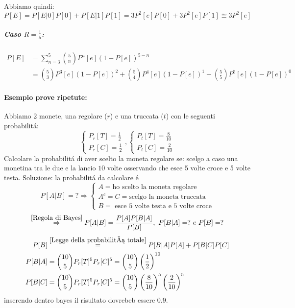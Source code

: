                 Abbiamo quindi:
                \[
                    P[E] =P[E|0]P[0] + P[E|1]P[1] = 3 P^2[e] P[0]+3 P^2[e]P[1] \cong 3 P^2[e]
                \] 
                \subparagraph{Caso $R=\frac{1}{5}$:}
                    \begin{align}
                        P[E] &= \sum_{n=3}^{5}\binom{5}{n}P^n[e](1-P[e])^{5-n} \nonumber \\
                             &= \binom{5}{3}P^3[e](1-P[e])^{2}+\binom{5}{4}P^4[e](1-P[e])^{1}+\binom{5}{5}P^5[e](1-P[e])^{0}\nonumber
                    \end{align}
            \paragraph{Esempio prove ripetute:} Abbiamo 2 monete, una regolare ($r$) e una truccata ($t$) con le seguenti probabilitá:
            \[
                \begin{cases}
                    P_r[T] = \frac{1}{2}\nonumber \\
                    P_r[C] = \frac{1}{2}\nonumber
                \end{cases},
                \begin{cases}
                    P_t[T] = \frac{8}{10}\nonumber \\
                    P_t[C] = \frac{2}{10}\nonumber
                \end{cases}
            \]
            Calcolare la probabilitá di aver scelto la moneta regolare se: scelgo a caso una monetina tra le due e la lancio $10$ volte
            osservando che esce 5 volte croce e 5 volte testa.
            Soluzione: la probabilitá da calcolare é 
            \[
                P[A|B] = ? \Rightarrow \begin{cases}
                    A = \text{ho scelto la moneta regolare}\nonumber \\
                    A^c = C = \text{scelgo la moneta truccata}\nonumber \\
                    B = \text{ esce 5 volte testa e 5 volte croce}\nonumber
                \end{cases}  
            \]
            \[
                \overset{\ref{Regola di Bayes}}{\Rightarrow} P[A|B] = \frac{P[A]P[B|A]}{P[B]},\ P[B|A] = ?\ e\ P[B] = ?\nonumber \\
            \]
            \begin{align}
                P[B] &\overset{\ref{Legge della probabilitá totale}}{ = } P[B|A]P[A] + P[B|C]P[C] \nonumber \\
                P[B|A] & = \binom{10}{5} P_r[T]^5P_r[C]^5 = \binom{10}{5} \left(\frac{1}{2}\right)^{10}\nonumber \\
                P[B|C] & = \binom{10}{5} P_r[T]^5P_r[C]^5 = \binom{10}{5} \left(\frac{8}{10}\right)^5\left(\frac{2}{10}\right)^5\nonumber
            \end{align}
            inserendo dentro bayes il risultato dovrebeb essere $0.9$.
